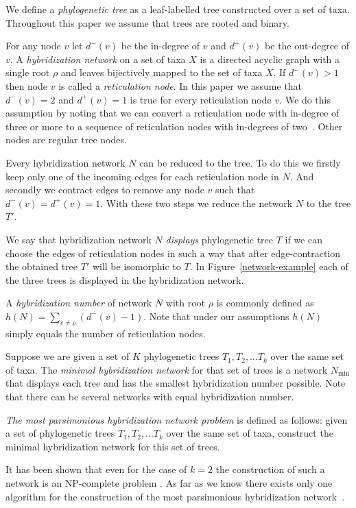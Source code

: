 \documentclass[runningheads, envcountsame, a4paper]{llncs}
\begin{document}
We define a \emph{phylogenetic tree} as a leaf-labelled tree constructed over a set of taxa. 
Throughout this paper we assume that trees are rooted and binary.

For any node $v$ let $d^-(v)$ be the in-degree of $v$ and $d^+(v)$ be the out-degree of $v$.
A \emph{hybridization network} on a set of taxa $X$ is a directed acyclic graph 
with a single root $\rho$ and leaves bijectively mapped to the set of taxa $X$. If $d^-(v) > 1$ then 
node $v$ is called a \emph{reticulation node}. In this paper we assume that $d^-(v) = 2$ and $d^+(v) = 1$ is true for every reticulation node $v$.
We do this assumption by noting that we can convert a reticulation node with in-degree 
of three or more to a sequence of reticulation nodes with in-degrees of two~\cite{wu2010close}. Other nodes are regular 
tree nodes.

Every hybridization network $N$ can be reduced to the tree. To do this we firstly keep only one of the incoming edges for each reticulation node in $N$. 
And secondly we contract edges to remove any node $v$ such that $d^-(v) = d^+(v) = 1$. With these two steps we reduce the network $N$ 
to the tree $T'$.

We say that hybridization network $N$ \emph{displays} phylogenetic tree $T$ 
if we can choose the edges of reticulation nodes in such a way that after edge-contraction the obtained tree $T'$ will be 
isomorphic to $T$. In Figure~\ref{network-example} each of the three trees is displayed in the hybridization network.

A \emph{hybridization number} of network $N$ with root $\rho$ is commonly defined as $h(N) = \sum\limits_{v \ne \rho} (d^-(v) - 1)$.
Note that under our assumptions $h(N)$ simply equals the number of reticulation nodes.

Suppose we are given a set of $K$ phylogenetic trees $T_1, T_2, ... T_k$ over the same set of taxa. The \emph{minimal 
hybridization network} for that set of trees is a network $N\mathrm{_{min}}$ that displays each tree and has the smallest 
hybridization number possible. Note that there can be several networks with equal hybridization number.

\emph{The most parsimonious hybridization network problem} is defined as follows:
given a set of phylogenetic trees $T_1, T_2, ... T_k$ over the same set of taxa, construct the minimal hybridization 
network for this set of trees.

It has been shown that even for the case of $k=2$ the construction of such a network is an NP-complete problem 
\cite {bordewich2007computing}. As far as we know there exists only one algorithm for the construction of the most 
parsimonious hybridization network~\cite{wu2013algorithm}.
\end{document}
